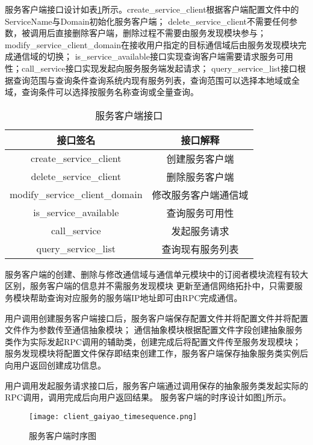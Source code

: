 服务客户端接口设计如表\ref{service_client_interface}所示。create\_service\_client根据客户端配置文件中的ServiceName与Domain初始化服务客户端；
delete\_service\_client不需要任何参数，被调用后直接删除客户端，删除过程不需要由服务发现模块参与；
modify\_service\_client\_domain在接收用户指定的目标通信域后由服务发现模块完成通信域的切换；
is\_service\_available接口实现查询客户端需要请求服务可用性；call\_service接口实现发起向服务服务端发起请求；
query\_service\_list接口根据查询范围与查询条件查询系统内现有服务列表，查询范围可以选择本地域或全域，查询条件可以选择按服务名称查询或全量查询。
\begin{table}[htb]
  \centering\small
  \caption{服务客户端接口}
  \renewcommand\arraystretch{1.2}
  \label{service_client_interface}
  \begin{tabular}{cc}
    \toprule
    接口签名 & 接口解释 \\
    \midrule
    create\_service\_client & 创建服务客户端\\
    delete\_service\_client & 删除服务客户端\\
    modify\_service\_client\_domain & 修改服务客户端通信域\\
    is\_service\_available & 查询服务可用性 \\
    call\_service & 发起服务请求\\
    query\_service\_list & 查询现有服务列表\\
    \bottomrule
  \end{tabular}
\end{table}

服务客户端的创建、删除与修改通信域与通信单元模块中的订阅者模块流程有较大区别，服务客户端的信息并不需服务发现模块
更新至通信网络拓扑中，只需要服务模块帮助查询对应服务的服务端IP地址即可由RPC完成通信。

用户调用创建服务客户端接口后，服务客户端保存配置文件并将配置文件并将配置文件作为参数传至通信抽象模块；
通信抽象模块根据配置文件字段创建抽象服务类作为实际发起RPC调用的辅助类，创建完成后将配置文件传至服务发现模块；
服务发现模块将配置文件保存即结束创建工作，服务客户端保存抽象服务类实例后向用户返回创建成功信息。

用户调用发起服务请求接口后，服务客户端通过调用保存的抽象服务类发起实际的RPC调用，调用完成后向用户返回结果。
服务客户端的时序设计如图\ref{client_gaiyao_timesequence}所示。

\begin{figure}[H]
  \centering
  \texttt{[image: client\_gaiyao\_timesequence.png]}
  \caption{服务客户端时序图}
  \label{client_gaiyao_timesequence}
\end{figure}

